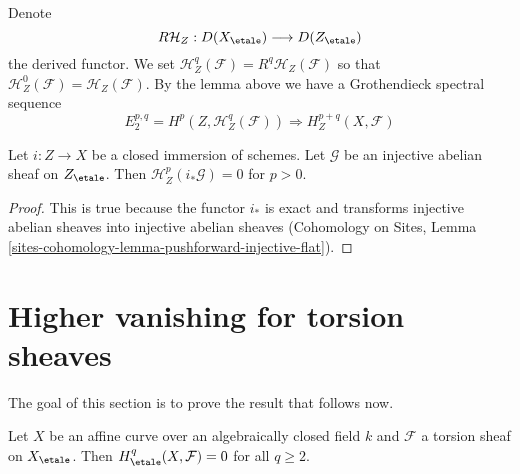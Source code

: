 \noindent
Denote
$$
R\mathcal{H}_Z : D(X_\etale) \longrightarrow D(Z_\etale)
$$
the derived functor. We set
$\mathcal{H}^q_Z(\mathcal{F}) = R^q\mathcal{H}_Z(\mathcal{F})$ so that
$\mathcal{H}^0_Z(\mathcal{F}) = \mathcal{H}_Z(\mathcal{F})$.
By the lemma above we have a Grothendieck spectral sequence
$$
E_2^{p, q} = H^p(Z, \mathcal{H}^q_Z(\mathcal{F}))
\Rightarrow H^{p + q}_Z(X, \mathcal{F})
$$

\begin{lemma}
\label{lemma-cohomology-with-support-sheaf-on-support}
Let $i : Z \to X$ be a closed immersion of schemes.
Let $\mathcal{G}$ be an injective abelian sheaf on $Z_\etale$.
Then $\mathcal{H}^p_Z(i_*\mathcal{G}) = 0$ for $p > 0$.
\end{lemma}

\begin{proof}
This is true because the functor $i_*$ is exact and transforms
injective abelian sheaves into injective abelian sheaves
(Cohomology on Sites, Lemma
\ref{sites-cohomology-lemma-pushforward-injective-flat}).
\end{proof}






\section{Higher vanishing for torsion sheaves}
\label{section-vanishing-torsion}

\noindent
The goal of this section is to prove the result that follows now.

\begin{theorem}
\label{theorem-vanishing-affine-curves}
Let $X$ be an affine curve over an algebraically closed field $k$ and
$\mathcal{F}$ a torsion sheaf on $X_\etale$. Then
$H_\etale^q(X, \mathcal{F}) = 0$ for all $q\geq 2$.
\end{theorem}

